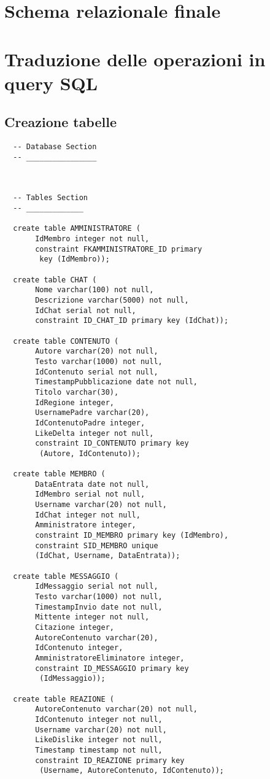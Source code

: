 \documentclass[a4paper,12pt]{report}
\begin{document}
\section{Schema relazionale finale}
\section{Traduzione delle operazioni in query SQL}
\subsection{Creazione  tabelle}
\begin{lstlisting}
  -- Database Section
  -- ________________ 
  
  
  
  -- Tables Section
  -- _____________ 
  
  create table AMMINISTRATORE (
       IdMembro integer not null,
       constraint FKAMMINISTRATORE_ID primary
        key (IdMembro));
  
  create table CHAT (
       Nome varchar(100) not null,
       Descrizione varchar(5000) not null,
       IdChat serial not null,
       constraint ID_CHAT_ID primary key (IdChat));
  
  create table CONTENUTO (
       Autore varchar(20) not null,
       Testo varchar(1000) not null,
       IdContenuto serial not null,
       TimestampPubblicazione date not null,
       Titolo varchar(30),
       IdRegione integer, 
       UsernamePadre varchar(20),
       IdContenutoPadre integer,
       LikeDelta integer not null,
       constraint ID_CONTENUTO primary key
        (Autore, IdContenuto));
  
  create table MEMBRO (
       DataEntrata date not null,
       IdMembro serial not null,
       Username varchar(20) not null,
       IdChat integer not null,
       Amministratore integer,
       constraint ID_MEMBRO primary key (IdMembro),
       constraint SID_MEMBRO unique 
       (IdChat, Username, DataEntrata));
  
  create table MESSAGGIO (
       IdMessaggio serial not null,
       Testo varchar(1000) not null,
       TimestampInvio date not null,
       Mittente integer not null,
       Citazione integer,
       AutoreContenuto varchar(20),
       IdContenuto integer,
       AmministratoreEliminatore integer,
       constraint ID_MESSAGGIO primary key
        (IdMessaggio));
  
  create table REAZIONE (
       AutoreContenuto varchar(20) not null,
       IdContenuto integer not null,
       Username varchar(20) not null,
       LikeDislike integer not null,
       Timestamp timestamp not null,
       constraint ID_REAZIONE primary key
        (Username, AutoreContenuto, IdContenuto));
  

\end{lstlisting}
\end{document}
